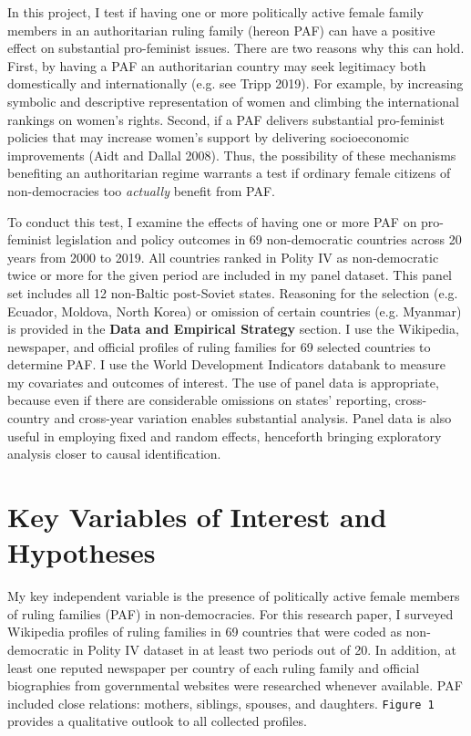 \documentclass[12pt]{article}
\begin{document}
In this project, I test if having one or more politically active female family members in an authoritarian ruling family (hereon PAF) can have a positive effect on substantial pro-feminist issues. There are two reasons why this can hold. First, by having a PAF an authoritarian country may seek legitimacy both domestically and internationally (e.g. see Tripp 2019). For example, by increasing symbolic and descriptive representation of women and climbing the international rankings on women's rights. Second, if a PAF delivers substantial pro-feminist policies that may increase women's support by delivering socioeconomic improvements (Aidt and Dallal 2008). Thus, the possibility of these mechanisms benefiting an authoritarian regime warrants a test if ordinary female citizens of non-democracies too \textit{actually} benefit from PAF.   

To conduct this test, I examine the effects of having one or more PAF on pro-feminist legislation and policy outcomes in 69 non-democratic countries across 20 years from 2000 to 2019. All countries ranked in Polity IV as non-democratic twice or more for the given period are included in my panel dataset. This panel set includes all 12 non-Baltic post-Soviet states. Reasoning for the selection (e.g. Ecuador, Moldova, North Korea) or omission of certain countries (e.g. Myanmar) is provided in the \textbf{Data and Empirical Strategy} section. I use the Wikipedia, newspaper, and official profiles of ruling families for 69 selected countries to determine PAF. I use the World Development Indicators databank to measure my covariates and outcomes of interest. The use of panel data is appropriate, because even if there are considerable omissions on states' reporting, cross-country and cross-year variation enables substantial analysis. Panel data is also useful in employing fixed and random effects, henceforth bringing exploratory analysis closer to causal identification. 

\section*{Key Variables of Interest and Hypotheses}
My key independent variable is the presence of politically active female members of ruling families (PAF) in non-democracies. For this research paper, I surveyed Wikipedia profiles of ruling families in 69 countries that were coded as non-democratic in Polity IV dataset in at least two periods out of 20. In addition, at least one reputed newspaper per country of each ruling family and official biographies from governmental websites were researched whenever available. PAF included close relations: mothers, siblings, spouses, and daughters. \texttt{Figure 1} provides a qualitative outlook to all collected profiles. 
\end{document}
